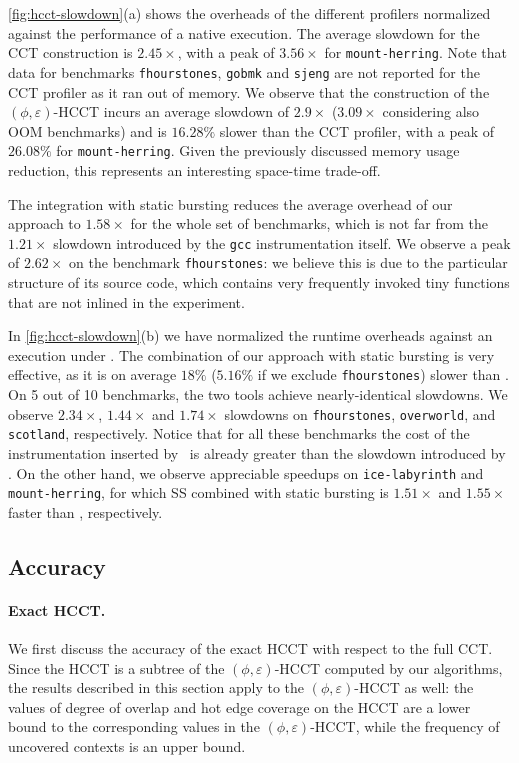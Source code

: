 \noindent \myfigure\ref{fig:hcct-slowdown}(a) shows the overheads of the different profilers normalized against the performance of a native execution. The average slowdown for the CCT construction is $2.45\times$, with a peak of $3.56\times$ for {\tt mount-herring}. Note that data for benchmarks {\tt fhourstones}, {\tt gobmk} and {\tt sjeng} are not reported for the CCT profiler as it ran out of memory. We observe that the construction of the $(\phi,\varepsilon)$-HCCT incurs an average slowdown of $2.9\times$ ($3.09\times$ considering also OOM benchmarks) and is $16.28\%$ slower than the CCT profiler, with a peak of $26.08\%$ for {\tt mount-herring}. Given the previously discussed memory usage reduction, this represents an interesting space-time trade-off.

The integration with static bursting reduces the average overhead of our approach to $1.58\times$ for the whole set of benchmarks, which is not far from the $1.21\times$ slowdown introduced by the {\tt gcc} instrumentation itself. We observe a peak of $2.62\times$ on the benchmark {\tt fhourstones}: we believe this is due to the particular structure of its source code, which contains very frequently invoked tiny functions that are not inlined in the experiment. %

In \myfigure\ref{fig:hcct-slowdown}(b) we have normalized the runtime overheads against an execution under \gprof. The combination of our approach with static bursting is very effective, as it is on average $18\%$ ($5.16\%$ if we exclude {\tt fhourstones}) slower than \gprof. On 5 out of 10 benchmarks, the two tools achieve nearly-identical slowdowns. We observe $2.34\times$, $1.44\times$ and $1.74\times$ slowdowns on {\tt fhourstones}, {\tt overworld}, and {\tt scotland}, respectively. Notice that for all these benchmarks the cost of the instrumentation inserted by \gcc\ is already greater than the slowdown introduced by \gprof. On the other hand, we observe appreciable speedups on {\tt ice-labyrinth} and {\tt mount-herring}, for which SS combined with static bursting is $1.51\times$ and $1.55\times$ faster than \gprof, respectively.

\subsection{Accuracy}
\label{ss:hcct-accuracy}

\paragraph*{Exact HCCT.} We first discuss the accuracy of the exact HCCT with respect to the full CCT. Since the HCCT is a subtree of the $(\phi,\varepsilon)$-HCCT computed by our algorithms, the results described in this section apply to the $(\phi,\varepsilon)$-HCCT as well: the values of degree of overlap and hot edge coverage on the HCCT are a lower bound to the corresponding values in the  $(\phi,\varepsilon)$-HCCT, while the frequency of uncovered contexts is an upper bound.

